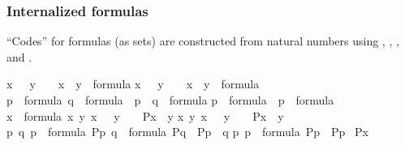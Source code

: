 \subsubsection*{Internalized formulas}
“Codes” for formulas (as sets) are constructed from natural
numbers using , , ,
and .%
\begin{isabelle}%
{\isasymlbrakk}x\ {\isasymin}\ {\isasymomega}{\isacharsemicolon}{\kern0pt}\ y\ {\isasymin}\ {\isasymomega}{\isasymrbrakk}\ {\isasymLongrightarrow}\ {\isasymcdot}x\ {\isasymin}\ y{\isasymcdot}\ {\isasymin}\ formula\isasep\isanewline%
{\isasymlbrakk}x\ {\isasymin}\ {\isasymomega}{\isacharsemicolon}{\kern0pt}\ y\ {\isasymin}\ {\isasymomega}{\isasymrbrakk}\ {\isasymLongrightarrow}\ {\isasymcdot}x\ {\isacharequal}{\kern0pt}\ y{\isasymcdot}\ {\isasymin}\ formula\isasep\isanewline%
{\isasymlbrakk}p\ {\isasymin}\ formula{\isacharsemicolon}{\kern0pt}\ q\ {\isasymin}\ formula{\isasymrbrakk}\ {\isasymLongrightarrow}\ {\isasymcdot}{\isasymnot}{\isacharparenleft}{\kern0pt}p\ {\isasymand}\ q{\isacharparenright}{\kern0pt}{\isasymcdot}\ {\isasymin}\ formula\isasep\isanewline%
p\ {\isasymin}\ formula\ {\isasymLongrightarrow}\ {\isacharparenleft}{\kern0pt}{\isasymcdot}{\isasymforall}p{\isasymcdot}{\isacharparenright}{\kern0pt}\ {\isasymin}\ formula\isasep\isanewline\isanewline%
{\isasymlbrakk}x\ {\isasymin}\ formula{\isacharsemicolon}{\kern0pt}\ {\isasymAnd}x\ y{\isachardot}{\kern0pt}\ {\isasymlbrakk}x\ {\isasymin}\ {\isasymomega}{\isacharsemicolon}{\kern0pt}\ y\ {\isasymin}\ {\isasymomega}{\isasymrbrakk}\ {\isasymLongrightarrow}\ P{\isacharparenleft}{\kern0pt}{\isasymcdot}x\ {\isasymin}\ y{\isasymcdot}{\isacharparenright}{\kern0pt}{\isacharsemicolon}{\kern0pt}\isanewline
\isaindent{\ }{\isasymAnd}x\ y{\isachardot}{\kern0pt}\ {\isasymlbrakk}x\ {\isasymin}\ {\isasymomega}{\isacharsemicolon}{\kern0pt}\ y\ {\isasymin}\ {\isasymomega}{\isasymrbrakk}\ {\isasymLongrightarrow}\ P{\isacharparenleft}{\kern0pt}{\isasymcdot}x\ {\isacharequal}{\kern0pt}\ y{\isasymcdot}{\isacharparenright}{\kern0pt}{\isacharsemicolon}{\kern0pt}\isanewline
\isaindent{\ }{\isasymAnd}p\ q{\isachardot}{\kern0pt}\ {\isasymlbrakk}p\ {\isasymin}\ formula{\isacharsemicolon}{\kern0pt}\ P{\isacharparenleft}{\kern0pt}p{\isacharparenright}{\kern0pt}{\isacharsemicolon}{\kern0pt}\ q\ {\isasymin}\ formula{\isacharsemicolon}{\kern0pt}\ P{\isacharparenleft}{\kern0pt}q{\isacharparenright}{\kern0pt}{\isasymrbrakk}\ {\isasymLongrightarrow}\ P{\isacharparenleft}{\kern0pt}{\isasymcdot}{\isasymnot}{\isacharparenleft}{\kern0pt}p\ {\isasymand}\ q{\isacharparenright}{\kern0pt}{\isasymcdot}{\isacharparenright}{\kern0pt}{\isacharsemicolon}{\kern0pt}\isanewline
\isaindent{\ }{\isasymAnd}p{\isachardot}{\kern0pt}\ {\isasymlbrakk}p\ {\isasymin}\ formula{\isacharsemicolon}{\kern0pt}\ P{\isacharparenleft}{\kern0pt}p{\isacharparenright}{\kern0pt}{\isasymrbrakk}\ {\isasymLongrightarrow}\ P{\isacharparenleft}{\kern0pt}{\isacharparenleft}{\kern0pt}{\isasymcdot}{\isasymforall}p{\isasymcdot}{\isacharparenright}{\kern0pt}{\isacharparenright}{\kern0pt}{\isasymrbrakk}\isanewline
{\isasymLongrightarrow}\ P{\isacharparenleft}{\kern0pt}x{\isacharparenright}{\kern0pt}%
\end{isabelle}%
